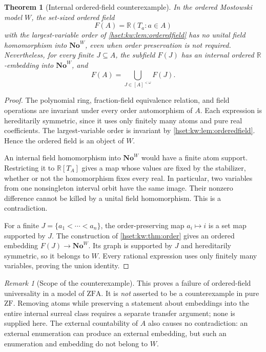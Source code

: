 \documentclass[11pt,letterpaper]{article}
\newtheorem{theorem}{Theorem}[section]
\theoremstyle{definition}
\theoremstyle{remark}
\newtheorem{remark}[remark]{Remark}\aliascntresetthe{remark}
\newcommand{\No}{\mathbf{No}}
\newcommand{\ZF}{\mathrm{ZF}}
\newcommand{\ZFA}{\mathrm{ZFA}}
\newcommand{\R}{\mathbb R}
\begin{document}
\begin{theorem}[Internal ordered-field counterexample]\label{hset:kw:thm:orderedcounter}
In the ordered Mostowski model $W$, the set-sized ordered field
\[
F(A)=\R(T_a:a\in A)
\]
with the largest-variable order of \cref{hset:kw:lem:orderedfield} has no unital field homomorphism into $\No^W$, even when order preservation is not required. Nevertheless, for every finite $J\subseteq A$, the subfield $F(J)$ has an internal ordered $\R$-embedding into $\No^W$, and
\[
F(A)=\bigcup_{J\in[A]^{<\omega}}F(J).
\]
\end{theorem}
\begin{proof}
The polynomial ring, fraction-field equivalence relation, and field operations are invariant under every order automorphism of $A$. Each expression is hereditarily symmetric, since it uses only finitely many atoms and pure real coefficients. The largest-variable order is invariant by \cref{hset:kw:lem:orderedfield}. Hence the ordered field is an object of $W$.

An internal field homomorphism into $\No^W$ would have a finite atom support. Restricting it to $\R[T_A]$ gives a map whose values are fixed by the stabilizer, whether or not the homomorphism fixes every real. In particular, two variables from one nonsingleton interval orbit have the same image. Their nonzero difference cannot be killed by a unital field homomorphism. This is a contradiction.

For a finite $J=\{a_1<\cdots<a_n\}$, the order-preserving map $a_i\mapsto i$ is a set map supported by $J$. The construction of \cref{hset:kw:thm:order} gives an ordered embedding $F(J)\to\No^W$. Its graph is supported by $J$ and hereditarily symmetric, so it belongs to $W$. Every rational expression uses only finitely many variables, proving the union identity.
\end{proof}

\begin{remark}[Scope of the counterexample]
This proves a failure of ordered-field universality in a model of $\ZFA$. It is \emph{not} asserted to be a counterexample in pure $\ZF$. Removing atoms while preserving a statement about embeddings into the entire internal surreal class requires a separate transfer argument; none is supplied here. The external countability of $A$ also causes no contradiction: an external enumeration can produce an external embedding, but such an enumeration and embedding do not belong to $W$.
\end{remark}
\end{document}
